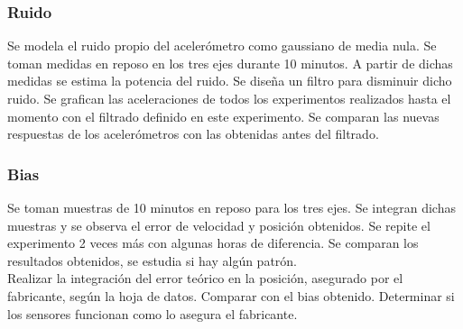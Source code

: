 \documentclass[spanish,12pt,a4paper,titlepage]{report}
\begin{document}
\subsubsection*{Ruido}
Se modela el ruido propio del acelerómetro como gaussiano de media nula. Se toman medidas en reposo en los tres ejes durante 10 minutos. A partir de dichas medidas se estima la potencia del ruido. Se diseña un filtro para disminuir dicho ruido. Se grafican las aceleraciones de todos los experimentos realizados hasta el momento con el filtrado definido en este experimento. Se comparan las nuevas respuestas de los acelerómetros con las obtenidas antes del filtrado. 

\subsubsection*{Bias}
Se toman muestras de 10 minutos en reposo para los tres ejes. Se integran dichas muestras y se observa el error de velocidad y posición obtenidos. Se repite el experimento 2 veces más con algunas horas de diferencia. Se comparan los resultados obtenidos, se estudia si hay algún patrón.\\ 

Realizar la integración del error teórico en la posición, asegurado por el fabricante, según la hoja de datos. Comparar con el bias obtenido. Determinar si los sensores funcionan como lo asegura el fabricante.
\end{document}
